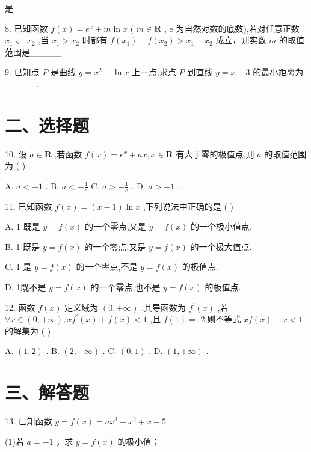 是

8. 已知函数 $f\left( x\right)  = {{e}}^{x} + m\ln x$ ( $m \in  \mathbf{R}$ , e 为自然对数的底数),若对任意正数 ${x}_{1}\text{ 、 }{x}_{2}$ ,当 ${x}_{1} > {x}_{2}$ 时都有 $f  \left( {x}_{1}\right)  - f\left( {x}_{2}\right)  > {x}_{1} - {x}_{2}$ 成立，则实数 $m$ 的取值范围是\_\_\_\_\_.

9. 已知点 $P$ 是曲线 $y = {x}^{2} - \ln x$ 上一点,求点 $P$ 到直线 $y = x - 3$ 的最小距离为\_\_\_\_\_.

\section*{二、选择题}

10. 设 $a \in  \mathbf{R}$ ,若函数 $f\left( x\right)  = {{e}}^{x} + {ax},x \in  \mathbf{R}$ 有大于零的极值点,则 $a$ 的取值范围为 ( )

A. $a <  - 1$ . B. $a <  - \frac{1}{{e}}$ C. $a >  - \frac{1}{{e}}$ . D. $a >  - 1$ .

11. 已知函数 $f\left( x\right)  = \left( {x - 1}\right) \ln x$ ,下列说法中正确的是 ( )

A. 1 既是 $y = f\left( x\right)$ 的一个零点,又是 $y = f\left( x\right)$ 的一个极小值点.

B. 1 既是 $y = f\left( x\right)$ 的一个零点,又是 $y = f\left( x\right)$ 的一个极大值点.

C. 1 是 $y = f\left( x\right)$ 的一个零点,不是 $y = f\left( x\right)$ 的极值点.

D. 1既不是 $y = f\left( x\right)$ 的一个零点,也不是 $y = f\left( x\right)$ 的极值点.

12. 函数 $f\left( x\right)$ 定义域为 $\left( {0, + \infty }\right)$ ,其导函数为 ${f}^{\prime }\left( x\right)$ ,若 $\forall x \in  \left( {0, + \infty }\right) ,x{f}^{\prime }\left( x\right)  + f\left( x\right)  < 1$ ,且 $f\left( 1\right)  =$ 2,则不等式 ${xf}\left( x\right)  - x < 1$ 的解集为 ( )

A. $\left( {1,2}\right)$ . B. $\left( {2, + \infty }\right)$ . C. $\left( {0,1}\right)$ . D. $\left( {1, + \infty }\right)$ .

\section*{三、解答题}

13. 已知函数 $y = f\left( x\right)  = a{x}^{3} - {x}^{2} + x - 5$ .

(1)若 $a =  - 1$ ，求 $y = f\left( x\right)$ 的极小值；

